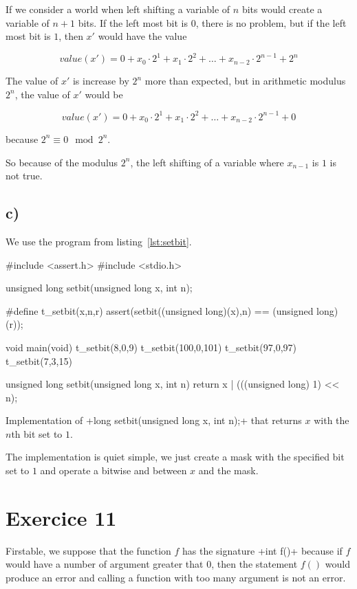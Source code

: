 \documentclass[a4paper,11pt]{report}
\begin{document}
If we consider a world when left shifting a variable of $n$ bits would create a
variable of $n + 1$ bits. If the left most bit is $0$, there is no problem, but
if the left most bit is $1$, then $x'$ would have the value

\[
  value(x') = 0 + x_0 \cdot 2^{1} + x_1 \cdot 2^{2} + \dots + x_{n-2} \cdot 2^{n-1} + 2^n
\]

The value of $x'$ is increase by $2^n$ more than expected, but in arithmetic
modulus $2^n$, the value of $x'$ would be


\[
  value(x') = 0 + x_0 \cdot 2^{1} + x_1 \cdot 2^{2} + \dots + x_{n-2} \cdot
  2^{n-1} + 0
\]

because $2^n \equiv 0 \mod 2^n$.

So because of the modulus $2^n$, the left shifting of a variable where $x_{n-1}$
is $1$ is not true.

\subsection*{c)}

We use the program from listing~\ref{lst:setbit}.

\begin{listing}[ht]
\centering
\begin{ccode}
#include <assert.h>
#include <stdio.h>

unsigned long setbit(unsigned long x, int n);

#define t_setbit(x,n,r) assert(setbit((unsigned long)(x),n) == (unsigned long)(r));

void main(void)
{
    t_setbit(8,0,9)
    t_setbit(100,0,101)
    t_setbit(97,0,97)
    t_setbit(7,3,15)
}

unsigned long setbit(unsigned long x, int n)
{
    return x | (((unsigned long) 1) << n);
}
\end{ccode}
\caption{Implementation of \cinline+long setbit(unsigned long x, int n);+ that
returns $x$ with the $n$th bit set to $1$.} 
\label{lst:setbit}
\end{listing}

The implementation is quiet simple, we just create a mask with the specified bit
set to $1$ and operate a bitwise and between $x$ and the mask.

\section*{Exercice 11}

Firstable, we suppose that the function $f$ has the signature \cinline+int f()+
because if $f$ would have a number of argument greater that $0$, then the
statement $f()$ would produce an error and calling a function with too many
argument is not an error.
\end{document}
